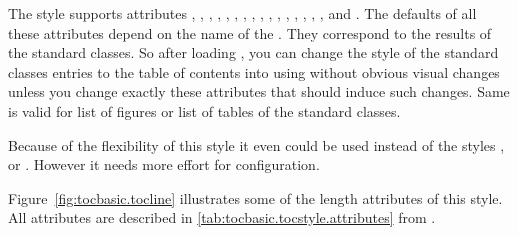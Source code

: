 \begin{description}
  The style supports attributes , ,
  , , ,
  , , ,
  , , ,
  , ,
  , , ,
  and . The defaults of all these attributes depend
  on the name of the . They correspond to the results of
  the standard classes. So after loading , you can change
  the style of the standard classes entries to the table of contents into
   using  without obvious visual
  changes unless you change exactly these attributes that should induce such
  changes. Same is valid for list of figures or list of tables of the standard
  classes.

  Because of the flexibility of this style it even could be used instead of
  the styles ,  or
  . However it needs more effort for configuration.

  {Figure~\ref*{fig:tocbasic.tocline}} illustrates some of the length
  attributes of this style. All attributes are described in
  \autoref{tab:tocbasic.tocstyle.attributes} from
  .
  \begin{figure}
    \centering
\end{figure}
\end{description}
